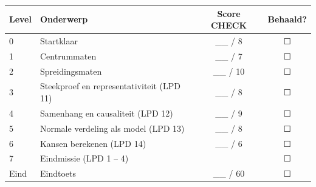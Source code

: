 \begin{tabular}{llcc}
\hline
Level & Onderwerp & Score CHECK & Behaald? \\
\hline
0 & Startklaar & \_\_ / 8 & ☐ \\
1 & Centrummaten & \_\_ / 7 & ☐ \\
2 & Spreidingsmaten & \_\_ / 10 & ☐ \\
3 & Steekproef en representativiteit (LPD 11) & \_\_ / 8 & ☐ \\
4 & Samenhang en causaliteit (LPD 12) & \_\_ / 9 & ☐ \\
5 & Normale verdeling als model (LPD 13) & \_\_ / 8 & ☐ \\
6 & Kansen berekenen (LPD 14) & \_\_ / 6 & ☐ \\
7 & Eindmissie (LPD 1 – 4) & & ☐ \\
Eind & Eindtoets & \_\_ / 60 & ☐ \\
\hline
\end{tabular}
